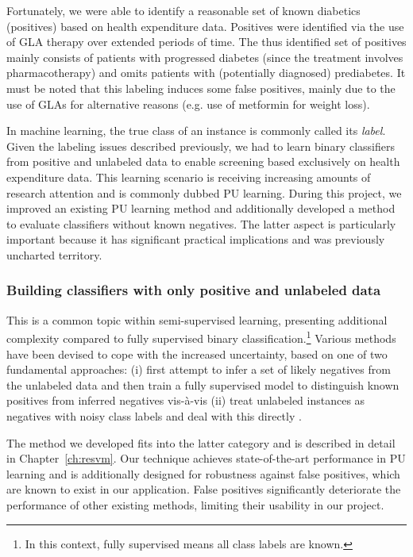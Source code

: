 Fortunately, we were able to identify a reasonable set of known diabetics (positives) based on health expenditure data. Positives were identified via the use of GLA therapy over extended periods of time. The thus identified set of positives mainly consists of patients with progressed diabetes (since the treatment involves pharmacotherapy) and omits patients with (potentially diagnosed) prediabetes. It must be noted that this labeling induces some false positives, mainly due to the use of GLAs for alternative reasons (e.g. use of metformin for weight loss).

In machine learning, the true class of an instance is commonly called its \emph{label}. Given the labeling issues described previously, we had to learn binary classifiers from positive and unlabeled data to enable screening based exclusively on health expenditure data. This learning scenario is receiving increasing amounts of research attention and is commonly dubbed PU learning. During this project, we improved an existing PU learning method \citep{mordelet2014bagging} and additionally developed a method to evaluate classifiers without known negatives. The latter aspect is particularly important because it has significant practical implications and was previously uncharted territory.

\subsubsection{Building classifiers with only positive and unlabeled data} 
This is a common topic within semi-supervised learning, presenting additional complexity compared to fully supervised binary classification.\footnote{In this context, fully supervised means all class labels are known.} Various methods have been devised to cope with the increased uncertainty, based on one of two fundamental approaches:
(i) first attempt to infer a set of likely negatives from the unlabeled data and then train a fully supervised model to distinguish known positives from inferred negatives \citep{liu02partially,Yu:2005:SCM:1108759.1108762,Li03learningto} vis-\`a-vis (ii) treat unlabeled instances as negatives with noisy class labels and deal with this directly \citep{Elkan:2008:LCO:1401890.1401920,Lee03learningwith,Liu:2003:BTC:951949.952139,mordelet2014bagging,Liu:2005:PSC:2138033.2138052}.

The method we developed fits into the latter category and is described in detail in Chapter~\ref{ch:resvm}. Our technique achieves state-of-the-art performance in PU learning and is additionally designed for robustness against false positives, which are known to exist in our application. False positives significantly deteriorate the performance of other existing methods, limiting their usability in our project.

